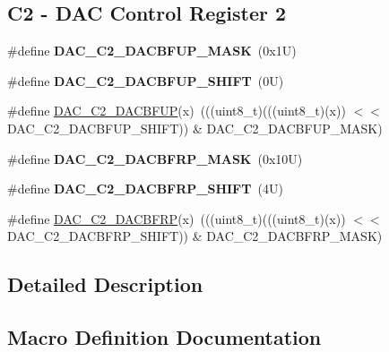\subsection*{C2 -\/ D\+AC Control Register 2}
\begin{DoxyCompactItemize}
\item 
\mbox{\label{group___d_a_c___register___masks_ga329015367026aaee34f54edcbaab61bb}} 
\#define {\bfseries D\+A\+C\+\_\+\+C2\+\_\+\+D\+A\+C\+B\+F\+U\+P\+\_\+\+M\+A\+SK}~(0x1\+U)
\item 
\mbox{\label{group___d_a_c___register___masks_ga5d43a79719748e490a572fa6cdc75efe}} 
\#define {\bfseries D\+A\+C\+\_\+\+C2\+\_\+\+D\+A\+C\+B\+F\+U\+P\+\_\+\+S\+H\+I\+FT}~(0\+U)
\item 
\#define \mbox{\hyperlink{group___d_a_c___register___masks_ga8047d00b752e60690bae95e47bd8d75e}{D\+A\+C\+\_\+\+C2\+\_\+\+D\+A\+C\+B\+F\+UP}}(x)~(((uint8\+\_\+t)(((uint8\+\_\+t)(x)) $<$$<$ D\+A\+C\+\_\+\+C2\+\_\+\+D\+A\+C\+B\+F\+U\+P\+\_\+\+S\+H\+I\+FT)) \& D\+A\+C\+\_\+\+C2\+\_\+\+D\+A\+C\+B\+F\+U\+P\+\_\+\+M\+A\+SK)
\item 
\mbox{\label{group___d_a_c___register___masks_ga64b53e5effabf2e736fca6088752e6ea}} 
\#define {\bfseries D\+A\+C\+\_\+\+C2\+\_\+\+D\+A\+C\+B\+F\+R\+P\+\_\+\+M\+A\+SK}~(0x10\+U)
\item 
\mbox{\label{group___d_a_c___register___masks_ga0ab880f693c25ecf491d3b76df611456}} 
\#define {\bfseries D\+A\+C\+\_\+\+C2\+\_\+\+D\+A\+C\+B\+F\+R\+P\+\_\+\+S\+H\+I\+FT}~(4\+U)
\item 
\#define \mbox{\hyperlink{group___d_a_c___register___masks_ga63520cda0dd201e556b139f064b82ee3}{D\+A\+C\+\_\+\+C2\+\_\+\+D\+A\+C\+B\+F\+RP}}(x)~(((uint8\+\_\+t)(((uint8\+\_\+t)(x)) $<$$<$ D\+A\+C\+\_\+\+C2\+\_\+\+D\+A\+C\+B\+F\+R\+P\+\_\+\+S\+H\+I\+FT)) \& D\+A\+C\+\_\+\+C2\+\_\+\+D\+A\+C\+B\+F\+R\+P\+\_\+\+M\+A\+SK)
\end{DoxyCompactItemize}


\subsection{Detailed Description}


\subsection{Macro Definition Documentation}
\mbox{\label{group___d_a_c___register___masks_ga897a82572de7b549bb53f9544086ea6b}} 
